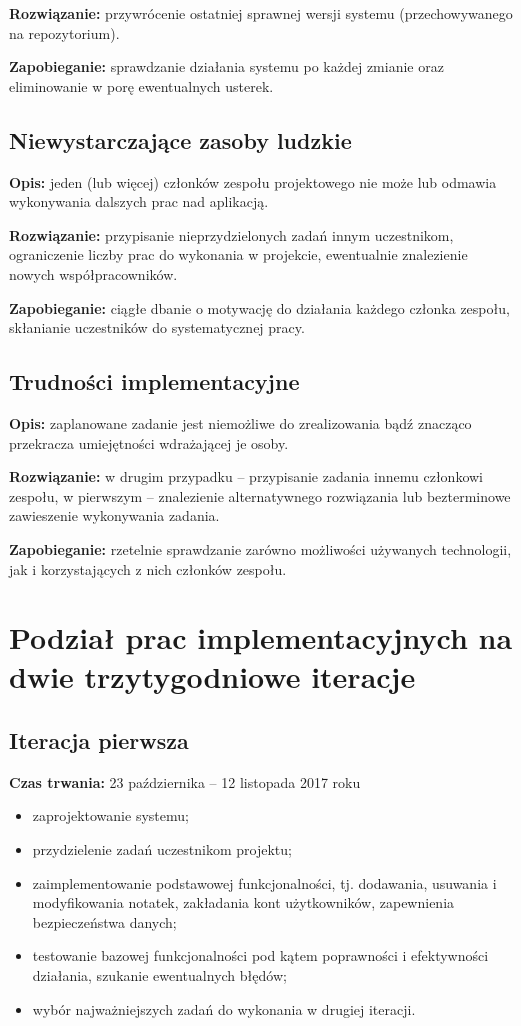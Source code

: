 \documentclass[a4paper,11pt]{article}
\begin{document}
      \noindent\textbf{Rozwiązanie:} przywrócenie ostatniej sprawnej wersji systemu (przechowywanego na repozytorium).
      
      \noindent\textbf{Zapobieganie:} sprawdzanie działania systemu po każdej zmianie oraz eliminowanie w porę ewentualnych usterek.

    \subsection{Niewystarczające zasoby ludzkie}
      \noindent\textbf{Opis:} jeden (lub więcej) członków zespołu projektowego nie może lub odmawia wykonywania dalszych prac nad aplikacją.
      
      \noindent\textbf{Rozwiązanie:} przypisanie nieprzydzielonych zadań innym uczestnikom, ograniczenie liczby prac do wykonania w projekcie, ewentualnie znalezienie nowych współpracowników.
      
      \noindent\textbf{Zapobieganie:} ciągłe dbanie o motywację do działania każdego członka zespołu, skłanianie uczestników do systematycznej pracy.

    \subsection{Trudności implementacyjne}
      \noindent\textbf{Opis:} zaplanowane zadanie jest niemożliwe do zrealizowania bądź znacząco przekracza umiejętności wdrażającej je osoby.

      \noindent\textbf{Rozwiązanie:} w drugim przypadku -- przypisanie zadania innemu członkowi zespołu, w pierwszym -- znalezienie alternatywnego rozwiązania lub bezterminowe zawieszenie wykonywania zadania.
      
      \noindent\textbf{Zapobieganie:} rzetelnie sprawdzanie zarówno możliwości używanych technologii, jak i korzystających z nich członków zespołu.

  \section{Podział prac implementacyjnych na dwie trzytygodniowe iteracje}
    \subsection{Iteracja pierwsza}
      \textbf{Czas trwania:} 23 października -- 12 listopada 2017 roku
      \begin{itemize}
        \item zaprojektowanie systemu;
        \item przydzielenie zadań uczestnikom projektu;
        \item zaimplementowanie podstawowej funkcjonalności, tj. dodawania, usuwania i modyfikowania notatek, zakładania kont użytkowników, zapewnienia bezpieczeństwa danych;
        \item testowanie bazowej funkcjonalności pod kątem poprawności i efektywności działania, szukanie ewentualnych błędów;
        \item wybór najważniejszych zadań do wykonania w drugiej iteracji.
      \end{itemize}
\end{document}
